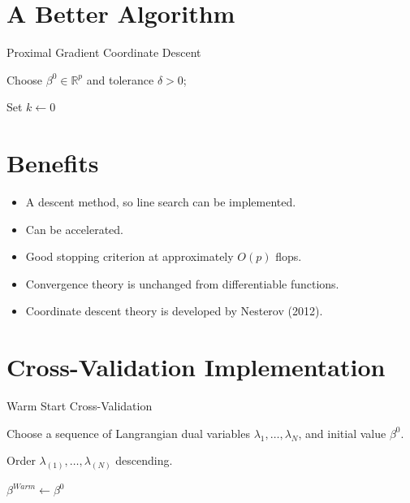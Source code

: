 \documentclass[10pt, reqno]{article}
\numberwithin{equation}{section}
\newcommand{\R}{\mathbb{R}}
\begin{document}
\newpage
\section*{A Better Algorithm}

\vspace{.5cm}
\begin{algorithm}[H]
\caption{Proximal Gradient Coordinate Descent}
Choose $\beta^0 \in \R^p$ and tolerance $\delta > 0$;

Set $k \gets 0$

\end{algorithm}

\newpage
\section*{Benefits}

\begin{itemize}
\item A descent method, so line search can be implemented.

\item Can be accelerated.

\item Good stopping criterion at approximately $O(p)$ flops.

\item Convergence theory is unchanged from differentiable functions.

\item Coordinate descent theory is developed by Nesterov (2012).

\end{itemize}

\newpage
\section*{Cross-Validation Implementation}

\vspace{.5cm}
\begin{algorithm}[H]
\caption{Warm Start Cross-Validation}
Choose a sequence of Langrangian dual variables $\lambda_1, \ldots, \lambda_N$, and initial value $\beta^0$.

Order $\lambda_{(1)}, \ldots, \lambda_{(N)}$ descending.

$\beta^{Warm} \gets \beta^0$ 


\end{algorithm}
\end{document}
